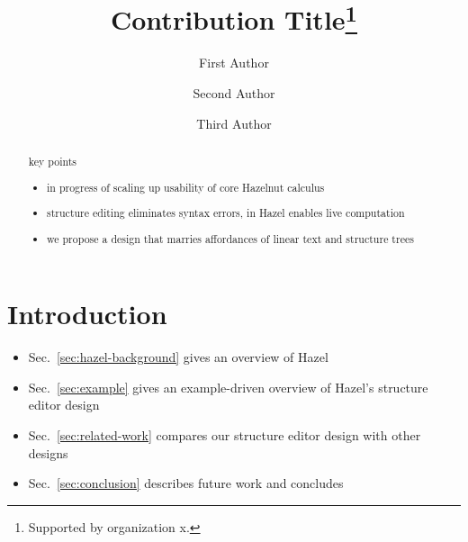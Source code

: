 \documentclass[runningheads]{llncs}
\begin{document}
%
\title{Contribution Title\thanks{Supported by organization x.}}
%
%
\author{First Author \and
Second Author \and
Third Author}
%
%
%
\maketitle              %
%
\begin{abstract}
key points
\begin{itemize}
\item in progress of scaling up usability of core Hazelnut calculus
\item structure editing eliminates syntax errors, in Hazel enables live computation
\item we propose a design that marries affordances of linear text and structure trees
\end{itemize}

\end{abstract}
%
%
%
\section{Introduction}

\begin{itemize}
\item Sec.~\ref{sec:hazel-background} gives an overview of Hazel
\item Sec.~\ref{sec:example} gives an example-driven overview of Hazel's structure editor design
\item Sec.~\ref{sec:related-work} compares our structure editor design with other designs
\item Sec.~\ref{sec:conclusion} describes future work and concludes
\end{itemize}
\end{document}
